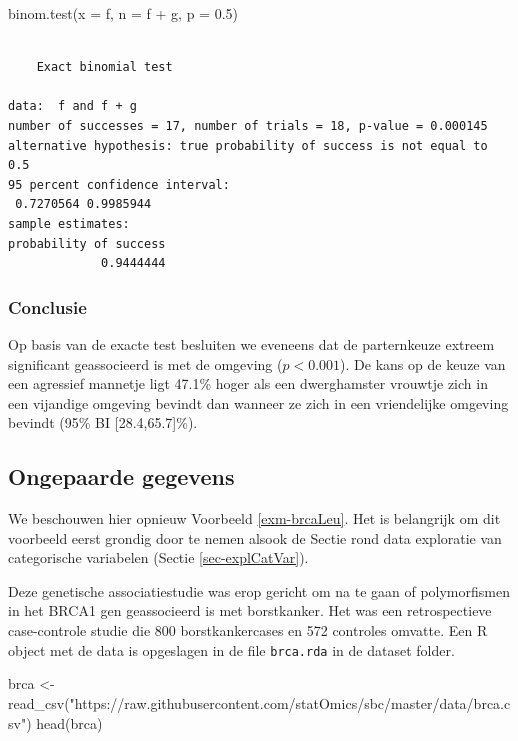 \documentclass[
  dutch,
  letterpaper,
  12pt]{book}
\newenvironment{Shaded}{\begin{snugshade}}{\end{snugshade}}
\newcommand{\AttributeTok}[1]{\textcolor[rgb]{0.40,0.45,0.13}{#1}}
\newcommand{\FloatTok}[1]{\textcolor[rgb]{0.68,0.00,0.00}{#1}}
\newcommand{\FunctionTok}[1]{\textcolor[rgb]{0.28,0.35,0.67}{#1}}
\newcommand{\NormalTok}[1]{\textcolor[rgb]{0.00,0.23,0.31}{#1}}
\newcommand{\OtherTok}[1]{\textcolor[rgb]{0.00,0.23,0.31}{#1}}
\newcommand{\SpecialCharTok}[1]{\textcolor[rgb]{0.37,0.37,0.37}{#1}}
\newcommand{\StringTok}[1]{\textcolor[rgb]{0.13,0.47,0.30}{#1}}
\theoremstyle{definition}
\theoremstyle{definition}
\theoremstyle{definition}
\theoremstyle{remark}
\begin{document}
\begin{Shaded}
\begin{Highlighting}[]
\FunctionTok{binom.test}\NormalTok{(}\AttributeTok{x =}\NormalTok{ f,}
  \AttributeTok{n =}\NormalTok{ f }\SpecialCharTok{+}\NormalTok{ g,}
  \AttributeTok{p =} \FloatTok{0.5}\NormalTok{)}
\end{Highlighting}
\end{Shaded}

\begin{verbatim}

    Exact binomial test

data:  f and f + g
number of successes = 17, number of trials = 18, p-value = 0.000145
alternative hypothesis: true probability of success is not equal to 0.5
95 percent confidence interval:
 0.7270564 0.9985944
sample estimates:
probability of success 
             0.9444444 
\end{verbatim}

\subsubsection{Conclusie}\label{conclusie-1}

Op basis van de exacte test besluiten we eveneens dat de parternkeuze
extreem significant geassocieerd is met de omgeving (\(p<0.001\)). De
kans op de keuze van een agressief mannetje ligt 47.1\% hoger als een
dwerghamster vrouwtje zich in een vijandige omgeving bevindt dan wanneer
ze zich in een vriendelijke omgeving bevindt (95\% BI
{[}28.4,65.7{]}\%).

\subsection{Ongepaarde gegevens}\label{sec-catOnPaired}

We beschouwen hier opnieuw Voorbeeld \ref{exm-brcaLeu}. Het is
belangrijk om dit voorbeeld eerst grondig door te nemen alsook de Sectie
rond data exploratie van categorische variabelen (Sectie
\ref{sec-explCatVar}).

Deze genetische associatiestudie was erop gericht om na te gaan of
polymorfismen in het BRCA1 gen geassocieerd is met borstkanker. Het was
een retrospectieve case-controle studie die 800 borstkankercases en 572
controles omvatte. Een R object met de data is opgeslagen in de file
\texttt{brca.rda} in de dataset folder.

\begin{Shaded}
\begin{Highlighting}[]
\NormalTok{brca }\OtherTok{\textless{}{-}} \FunctionTok{read\_csv}\NormalTok{(}\StringTok{"https://raw.githubusercontent.com/statOmics/sbc/master/data/brca.csv"}\NormalTok{)}
\FunctionTok{head}\NormalTok{(brca)}
\end{Highlighting}
\end{Shaded}
\end{document}
